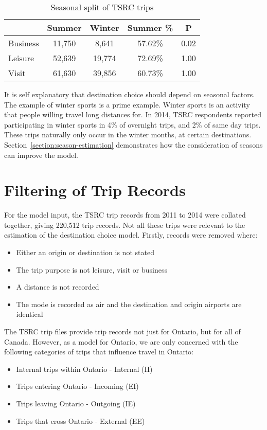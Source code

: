\begin{table}[H]
\centering
\caption{Seasonal split of TSRC trips}
\label{table:season-split}
\begin{tabular}{p{4.07em}cccc}
\toprule
\multicolumn{1}{r}{} & \multicolumn{1}{p{5em}}{Summer} & \multicolumn{1}{p{4.645em}}{Winter} & \multicolumn{1}{p{3.93em}}{Summer \%} & P  \\ \midrule
Business & 11,750 & 8,641  & 57.62\% & 0.02 \\
Leisure & 52,639 & 19,774 & 72.69\% & 1.00 \\
Visit & 61,630 & 39,856 & 60.73\% & 1.00 \\ \bottomrule
\end{tabular}%

\end{table}


It is self explanatory that destination choice should depend on seasonal factors. The example of winter sports is a prime example. Winter sports is an activity that people willing travel long distances for. In 2014, TSRC respondents reported participating in winter sports in 4\% of overnight trips, and 2\% of same day trips. These trips naturally only occur in the winter months, at certain destinations. Section~\ref{section:season-estimation} demonstrates how the consideration of seasons can improve the model. 

\section{Filtering of Trip Records}
For the model input, the TSRC trip records from 2011 to 2014 were collated together, giving 220,512 trip records. Not all these trips were relevant to the estimation of the destination choice model. Firstly, records were removed where:
\begin{itemize}
\item Either an origin or destination is not stated
\item The trip purpose is not leisure, visit or business
\item A distance is not recorded
\item The mode is recorded as air and the destination and origin airports are identical
\end{itemize}

The TSRC trip files provide trip records not just for Ontario, but for all of Canada. However, as a model for Ontario, we are only concerned with the following categories of trips that influence travel in Ontario:
\begin{itemize}
\item Internal trips within Ontario - Internal (II)
\item Trips entering Ontario - Incoming (EI)
\item Trips leaving Ontario - Outgoing (IE)
\item Trips that cross Ontario - External (EE)
\end{itemize}

